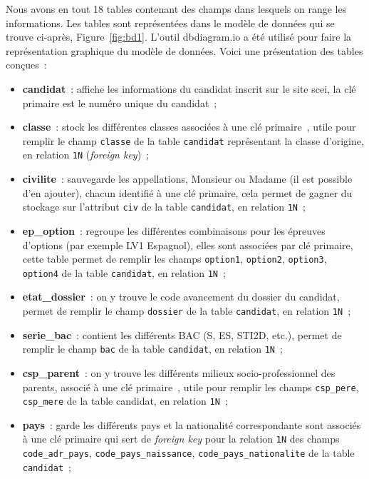 \documentclass[12pt]{article}
\begin{document}
    Nous avons en tout 18 tables contenant des champs dans lesquels on range les informations. Les tables sont représentées dans le modèle de données qui se trouve ci-après, Figure~\ref{fig:bd1}. L'outil \textsf{dbdiagram.io} a été utilisé pour faire la représentation graphique du modèle de données. Voici une présentation des tables conçues~:
        \begin{itemize}[label=\textbullet]
            \item \textbf{candidat}~: affiche les informations du candidat inscrit sur le site \textsf{scei}, la clé primaire est le numéro unique du candidat~;
            \item \textbf{classe}~: stock les différentes classes associées à une clé primaire~, utile pour remplir le champ \texttt{classe} de la table \texttt{candidat} représentant la classe d'origine, en relation \texttt{1N} (\textsl{foreign key})~;
            \item \textbf{civilite}~: sauvegarde les appellations, Monsieur ou Madame (il est possible d'en ajouter), chacun identifié à une clé primaire, cela permet de gagner du stockage sur l'attribut \texttt{civ} de la table \texttt{candidat}, en relation \texttt{1N}~;
            \item \textbf{ep\_option}~: regroupe les différentes combinaisons pour les épreuves d'options (par exemple LV1 Espagnol), elles sont associées par clé primaire, cette table permet de remplir les champs \texttt{option1}, \texttt{option2}, \texttt{option3}, \texttt{option4} de la table \texttt{candidat}, en relation \texttt{1N}~;
            \item \textbf{etat\_dossier}~: on y trouve le code avancement du dossier du candidat, permet de remplir le champ \texttt{dossier} de la table \texttt{candidat}, en relation \texttt{1N}~;
            \item \textbf{serie\_bac}~: contient les différents BAC (S, ES, STI2D, etc.), permet de remplir le champ \texttt{bac} de la table \texttt{candidat}, en relation \texttt{1N}~;
            \item \textbf{csp\_parent}~: on y trouve les différents milieux socio-professionnel des parents, associé à une clé primaire~, utile pour remplir les champs \texttt{csp\_pere}, \texttt{csp\_mere} de la table candidat, en relation \texttt{1N}~;
            \item \textbf{pays}~: garde les différents pays et la nationalité correspondante sont associés à une clé primaire qui sert de \textsl{foreign key} pour la relation \texttt{1N} des champs \texttt{code\_adr\_pays}, \texttt{code\_pays\_naissance}, \texttt{code\_pays\_nationalite} de la table \texttt{candidat}~;

\end{itemize}
\end{document}
